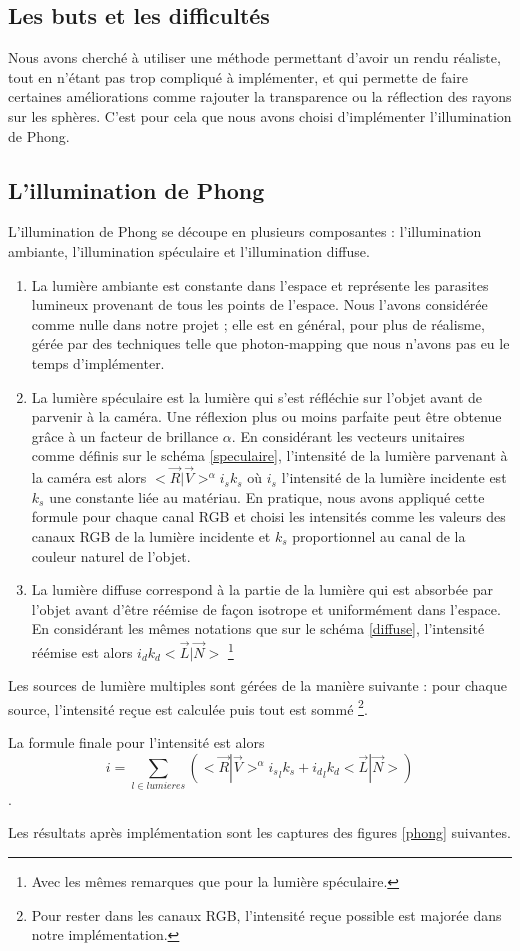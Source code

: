 \subsection{Les buts et les difficultés}
Nous avons cherché à utiliser une méthode permettant d'avoir un rendu réaliste, tout en n'étant pas trop compliqué à implémenter, et qui permette de faire certaines améliorations comme rajouter la transparence ou la réflection des rayons sur les sphères. C'est pour cela que nous avons choisi d'implémenter l'illumination de Phong.

\subsection{L'illumination de Phong}

L'illumination de Phong se découpe en plusieurs composantes : l'illumination ambiante, l'illumination spéculaire et l'illumination diffuse.
\begin{enumerate}
\item La lumière ambiante est constante dans l'espace et représente les parasites lumineux provenant de tous les points de l'espace. Nous l'avons considérée comme nulle dans notre projet ; elle est en général, pour plus de réalisme, gérée par des techniques telle que photon-mapping que nous n'avons pas eu le temps d'implémenter.
\item La lumière spéculaire est la lumière qui s'est réfléchie sur l'objet avant de parvenir à la caméra. Une réflexion plus ou moins parfaite peut être obtenue grâce à un facteur de brillance $\alpha$. En considérant les vecteurs unitaires comme définis sur le schéma \ref{speculaire}, l'intensité de la lumière parvenant à la caméra est alors $<\vec{R}|\vec{V}>^{\alpha} i_{s} k_{s}$ où $i_{s}$ l'intensité de la lumière incidente est $k_{s}$ une constante liée au matériau. En pratique, nous avons appliqué cette formule pour chaque canal RGB et choisi les intensités comme les valeurs des canaux RGB de la lumière incidente et $k_{s}$ proportionnel au canal de la couleur naturel de l'objet.
\item La lumière diffuse correspond à la partie de la lumière qui est absorbée par l'objet avant d'être réémise de façon isotrope et uniformément dans l'espace. En considérant les mêmes notations que sur le schéma \ref{diffuse}, l'intensité réémise est alors $i_{d}k_{d}<\vec{L}|\vec{N}>$ \footnote{Avec les mêmes remarques que pour la lumière spéculaire.}
\end{enumerate}

Les sources de lumière multiples sont gérées de la manière suivante : pour chaque source, l'intensité reçue est calculée puis tout est sommé \footnote{Pour rester dans les canaux RGB, l'intensité reçue possible est majorée dans notre implémentation.}.

La formule finale pour l'intensité est alors \[i = \sum_{l \in lumieres}(<\vec{R}|\vec{V}>^{\alpha} {i_{s}}_{l} k_{s} + {i_{d}}_{l}k_{d}<\vec{L}|\vec{N}>)\].

Les résultats après implémentation sont les captures des figures \ref{phong} suivantes.